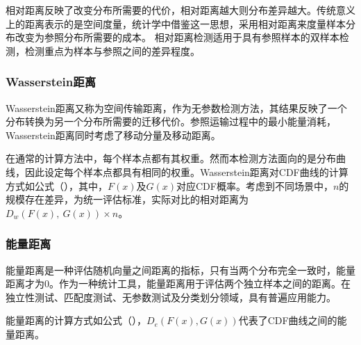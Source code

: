 相对距离反映了改变分布所需要的代价，相对距离越大则分布差异越大。传统意义上的距离表示的是空间度量，统计学中借鉴这一思想，采用相对距离来度量样本分布改变为参照分布所需要的成本。
相对距离检测适用于具有参照样本的双样本检测，检测重点为样本与参照之间的差异程度。

\subsubsection{Wasserstein距离}
\label{chap:analyze:statistical:distance:wasserstein}

Wasserstein距离又称为空间传输距离，作为无参数检测方法，其结果反映了一个分布转换为另一个分布所需要的迁移代价。参照运输过程中的最小能量消耗，Wasserstein距离同时考虑了移动分量及移动距离。


在通常的计算方法中，每个样本点都有其权重。然而本检测方法面向的是分布曲线，因此设定每个样本点都具有相同的权重。Wasserstein距离对CDF曲线的计算方式如公式（），其中，$F(x)$及$G(x)$对应CDF概率。考虑到不同场景中，$n$的规模存在差异，为统一评估标准，实际对比的相对距离为$D_{w}(F(x),\ G(x))\times n$。

\subsubsection{能量距离}
\label{chap:analyze:statistical:distance:energy}

能量距离是一种评估随机向量之间距离的指标，只有当两个分布完全一致时，能量距离才为0。作为一种统计工具，能量距离用于评估两个独立样本之间的距离。在独立性测试、匹配度测试、无参数测试及分类划分领域，具有普遍应用能力。


能量距离的计算方式如公式（），$D_{e}(F(x),G(x))$代表了CDF曲线之间的能量距离。


